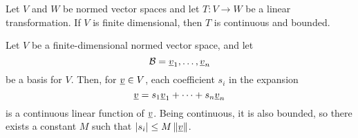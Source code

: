 \begin{theorem}
Let $V$ and $W$ be normed vector spaces and let $T \colon V \rightarrow W$ be a linear transformation.
If $V$ is finite dimensional, then $T$ is continuous and bounded.
\end{theorem}

\begin{lemma}
Let $V$ be a finite-dimensional normed vector space, and let
\begin{equation*}
\mathcal{B} = \underline{v}_1, \ldots, \underline{v}_n
\end{equation*}
be a basis for $V$.
Then, for $\underline{v} \in V$, each coefficient $s_i$ in the expansion
\begin{equation*}
\underline{v} = s_1 \underline{v}_1 + \cdots + s_n \underline{v}_n
\end{equation*}
is a continuous linear function of $\underline{v}$.
Being continuous, it is also bounded, so there exists a constant $M$ such that $|s_i| \leq M \left\| \underline{v} \right\|$.
\end{lemma}
